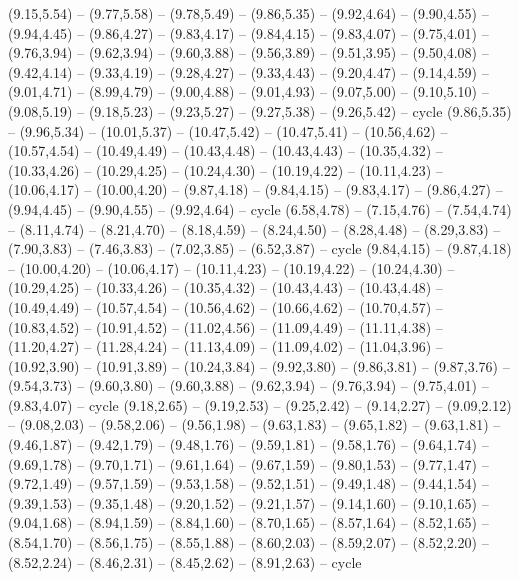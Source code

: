 \expandafter\def\csname geo:gebiet:IL\endcsname{
  (9.15,5.54) -- (9.77,5.58) -- (9.78,5.49) -- (9.86,5.35) -- (9.92,4.64) -- (9.90,4.55) -- (9.94,4.45) -- (9.86,4.27) -- (9.83,4.17) -- (9.84,4.15) -- (9.83,4.07) -- (9.75,4.01) -- (9.76,3.94) -- (9.62,3.94) -- (9.60,3.88) -- (9.56,3.89) -- (9.51,3.95) -- (9.50,4.08) -- (9.42,4.14) -- (9.33,4.19) -- (9.28,4.27) -- (9.33,4.43) -- (9.20,4.47) -- (9.14,4.59) -- (9.01,4.71) -- (8.99,4.79) -- (9.00,4.88) -- (9.01,4.93) -- (9.07,5.00) -- (9.10,5.10) -- (9.08,5.19) -- (9.18,5.23) -- (9.23,5.27) -- (9.27,5.38) -- (9.26,5.42) -- cycle}
\expandafter\def\csname geo:gebiet:IN\endcsname{
  (9.86,5.35) -- (9.96,5.34) -- (10.01,5.37) -- (10.47,5.42) -- (10.47,5.41) -- (10.56,4.62) -- (10.57,4.54) -- (10.49,4.49) -- (10.43,4.48) -- (10.43,4.43) -- (10.35,4.32) -- (10.33,4.26) -- (10.29,4.25) -- (10.24,4.30) -- (10.19,4.22) -- (10.11,4.23) -- (10.06,4.17) -- (10.00,4.20) -- (9.87,4.18) -- (9.84,4.15) -- (9.83,4.17) -- (9.86,4.27) -- (9.94,4.45) -- (9.90,4.55) -- (9.92,4.64) -- cycle}
\expandafter\def\csname geo:gebiet:KS\endcsname{
  (6.58,4.78) -- (7.15,4.76) -- (7.54,4.74) -- (8.11,4.74) -- (8.21,4.70) -- (8.18,4.59) -- (8.24,4.50) -- (8.28,4.48) -- (8.29,3.83) -- (7.90,3.83) -- (7.46,3.83) -- (7.02,3.85) -- (6.52,3.87) -- cycle}
\expandafter\def\csname geo:gebiet:KY\endcsname{
  (9.84,4.15) -- (9.87,4.18) -- (10.00,4.20) -- (10.06,4.17) -- (10.11,4.23) -- (10.19,4.22) -- (10.24,4.30) -- (10.29,4.25) -- (10.33,4.26) -- (10.35,4.32) -- (10.43,4.43) -- (10.43,4.48) -- (10.49,4.49) -- (10.57,4.54) -- (10.56,4.62) -- (10.66,4.62) -- (10.70,4.57) -- (10.83,4.52) -- (10.91,4.52) -- (11.02,4.56) -- (11.09,4.49) -- (11.11,4.38) -- (11.20,4.27) -- (11.28,4.24) -- (11.13,4.09) -- (11.09,4.02) -- (11.04,3.96) -- (10.92,3.90) -- (10.91,3.89) -- (10.24,3.84) -- (9.92,3.80) -- (9.86,3.81) -- (9.87,3.76) -- (9.54,3.73) -- (9.60,3.80) -- (9.60,3.88) -- (9.62,3.94) -- (9.76,3.94) -- (9.75,4.01) -- (9.83,4.07) -- cycle}
\expandafter\def\csname geo:gebiet:LA\endcsname{
  (9.18,2.65) -- (9.19,2.53) -- (9.25,2.42) -- (9.14,2.27) -- (9.09,2.12) -- (9.08,2.03) -- (9.58,2.06) -- (9.56,1.98) -- (9.63,1.83) -- (9.65,1.82) -- (9.63,1.81) -- (9.46,1.87) -- (9.42,1.79) -- (9.48,1.76) -- (9.59,1.81) -- (9.58,1.76) -- (9.64,1.74) -- (9.69,1.78) -- (9.70,1.71) -- (9.61,1.64) -- (9.67,1.59) -- (9.80,1.53) -- (9.77,1.47) -- (9.72,1.49) -- (9.57,1.59) -- (9.53,1.58) -- (9.52,1.51) -- (9.49,1.48) -- (9.44,1.54) -- (9.39,1.53) -- (9.35,1.48) -- (9.20,1.52) -- (9.21,1.57) -- (9.14,1.60) -- (9.10,1.65) -- (9.04,1.68) -- (8.94,1.59) -- (8.84,1.60) -- (8.70,1.65) -- (8.57,1.64) -- (8.52,1.65) -- (8.54,1.70) -- (8.56,1.75) -- (8.55,1.88) -- (8.60,2.03) -- (8.59,2.07) -- (8.52,2.20) -- (8.52,2.24) -- (8.46,2.31) -- (8.45,2.62) -- (8.91,2.63) -- cycle}
